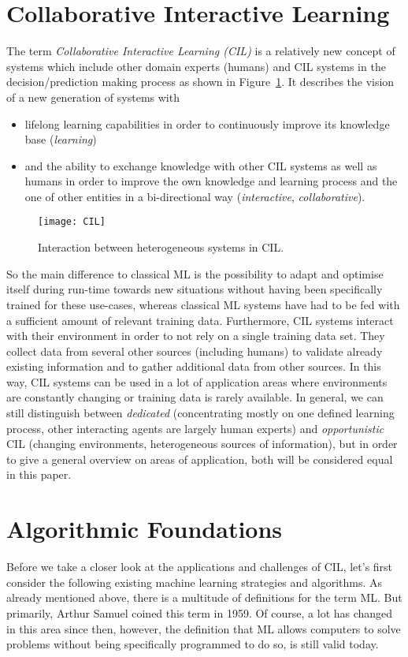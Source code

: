 \documentclass[conference]{IEEEtran}
\begin{document}
\section{Collaborative Interactive Learning}\label{sec:cil}
The term \textit{Collaborative Interactive Learning (CIL)} is a relatively new concept of systems which 
include other domain experts (humans) and CIL systems in the decision/prediction making process 
as shown in Figure~\ref{fig:CIL}. It describes the vision of a new 
generation of systems with
\begin{itemize}
    \item lifelong learning capabilities in order to continuously improve its 
        knowledge base (\textit{learning})
    \item and the ability to exchange knowledge with other CIL systems as well as humans 
        in order to improve the own knowledge and learning process and the one of other entities in a 
        bi-directional way (\textit{interactive}, \textit{collaborative})\cite{CIL:sick}.
\end{itemize}
\begin{figure}[!h]
\centering
\texttt{[image: CIL]}
\caption{Interaction between heterogeneous systems in CIL.}
\label{fig:CIL}
\end{figure}
So the main difference to classical ML is the possibility to adapt and optimise itself during run-time 
towards new situations without having been specifically trained for these use-cases, whereas classical ML 
systems have had to be fed with a sufficient amount of relevant training data\cite{CIL:sick}\cite{Organic:schloer}.
Furthermore, CIL systems interact with their environment in order to not rely on a single training data set. 
They collect data from several other sources (including humans) to validate already existing information and to 
gather additional data from other sources. In this way, CIL systems can be used in a lot of application areas where 
environments are constantly changing or training data is rarely available.
In general, we can still distinguish between \textit{dedicated} (concentrating mostly on one defined learning process, 
other interacting agents are largely human experts) and \textit{opportunistic} CIL (changing environments, heterogeneous 
sources of information)\cite{CIL:sick}, 
but in order to give a general overview on areas of application, both will be considered equal in this paper.

\section{Algorithmic Foundations}
\label{sec:algos}
Before we take a closer look at the applications and challenges of CIL, let's first consider the 
following existing machine learning strategies and algorithms. As already mentioned above, 
there is a multitude of definitions for the term ML\@. But primarily, Arthur Samuel 
coined this term in 1959. Of course, a lot has changed in this area since then, 
however, the definition that ML allows computers to solve problems without being 
specifically programmed to do so, is still valid today\cite{MLStudiesUsingCheckers:samuel}.
\end{document}
